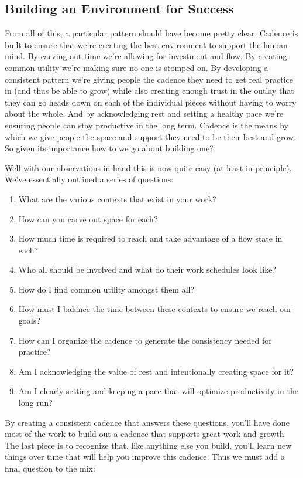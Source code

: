 \documentclass[10pt,a5paper]{book}
\begin{document}
\subsection{Building an Environment for Success}
From all of this, a particular pattern should have become pretty clear. Cadence is built to ensure that we're creating the best environment to support the human mind. By carving out time we're allowing for investment and flow. By creating common utility we're making sure no one is stomped on. By developing a consistent pattern we're giving people the cadence they need to get real practice in (and thus be able to grow) while also creating enough trust in the outlay that they can go heads down on each of the individual pieces without having to worry about the whole. And by acknowledging rest and setting a healthy pace we're ensuring people can stay productive in the long term. Cadence is the means by which we give people the space and support they need to be their best and grow. So given its importance how to we go about building one?

Well with our observations in hand this is now quite easy (at least in principle). We've essentially outlined a series of questions:
\begin{enumerate}
\item What are the various contexts that exist in your work?
\item How can you carve out space for each?
\item How much time is required to reach and take advantage of a flow state in each?
\item Who all should be involved and what do their work schedules look like?
\item How do I find common utility amongst them all?
\item How must I balance the time between these contexts to ensure we reach our goals?
\item How can I organize the cadence to generate the consistency needed for practice?
\item Am I acknowledging the value of rest and intentionally creating space for it?
\item Am I clearly setting and keeping a pace that will optimize productivity in the long run?
\end{enumerate}

By creating a consistent cadence that answers these questions, you'll have done most of the work to build out a cadence that supports great work and growth. The last piece is to recognize that, like anything else you build, you'll learn new things over time that will help you improve this cadence. Thus we must add a final question to the mix:\linebreak
\end{document}
